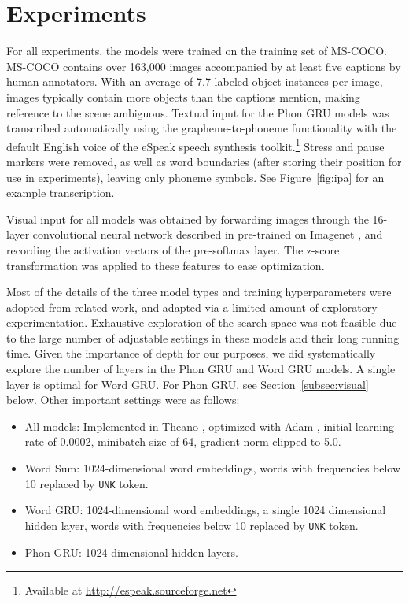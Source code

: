 \section{Experiments}
\label{sec:experiments}

For all experiments, the models were trained on the training set of MS-COCO. MS-COCO contains over 163,000 images accompanied by at least five captions by human annotators. With an average of 7.7 labeled object instances per image, images typically contain more objects than the captions mention, making reference to the scene ambiguous. Textual input for the {\sc Phon GRU} models was transcribed automatically using the grapheme-to-phoneme functionality with the default English voice of the eSpeak speech synthesis toolkit.\footnote{Available at \url{http://espeak.sourceforge.net}} Stress and pause markers were removed, as well as word boundaries (after storing their position for use in experiments), leaving only phoneme symbols. See Figure~\ref{fig:ipa} for an example transcription.


Visual input for all models was obtained by forwarding images through the 16-layer convolutional neural network described in  pre-trained on Imagenet \cite{ILSVRCarxiv14}, and recording the activation vectors of the pre-softmax layer. The z-score transformation was applied to these features to ease optimization. 

Most of the details of the three model types and training
hyperparameters were adopted from related work, and adapted via
a limited amount of exploratory experimentation. Exhaustive exploration of the search space was not feasible due to the large number of adjustable settings in these models and their long running time. Given the importance of depth for our purposes, we did systematically explore the number of layers in the {\sc Phon GRU} and {\sc Word GRU} models. A single layer is optimal for {\sc Word GRU}. For {\sc Phon GRU}, see Section~\ref{subsec:visual} below. Other important settings were as follows:
\begin{itemize}
\setlength\itemsep{-0.5em}
\item All models: Implemented in Theano \cite{Bastien-Theano-2012}, optimized with 
  Adam \cite{DBLP:journals/corr/KingmaB14}, initial learning rate of 0.0002, minibatch size
  of 64, gradient norm clipped to 5.0.
\item {\sc Word Sum}: 1024-dimensional word embeddings, words with frequencies below 10 replaced by {\tt UNK} token.
\item {\sc Word GRU}: 1024-dimensional word embeddings, a single 1024 dimensional hidden layer, words with frequencies below 10 replaced by {\tt UNK} token.
\item {\sc Phon GRU}: 1024-dimensional hidden layers.
\end{itemize}

